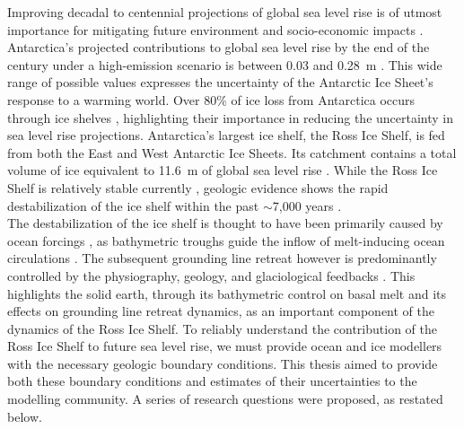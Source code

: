 

Improving decadal to centennial projections of global sea level rise is of utmost importance for mitigating future environment and socio-economic impacts \citep{durandsealevel2022}. 
Antarctica's projected contributions to global sea level rise by the end of the century under a high-emission scenario is between 0.03 and 0.28~m \citep[RCP 8.5,][]{intergovernmentalpanelonclimatechangeipccocean2022}. 
This wide range of possible values expresses the uncertainty of the Antarctic Ice Sheet's response to a warming world. 
Over 80\% of ice loss from Antarctica occurs through ice shelves \citep{rignoticeshelf2013}, highlighting their importance in reducing the uncertainty in sea level rise projections. 
Antarctica's largest ice shelf, the Ross Ice Shelf, is fed from both the East and West Antarctic Ice Sheets. 
Its catchment contains a total volume of ice equivalent to 11.6~m of global sea level rise \citep{fretwellbedmap22013, rignotantarctic2011, tintoross2019}. 
While the Ross Ice Shelf is relatively stable currently \citep{moholdtbasal2014, rignoticeshelf2013}, geologic evidence shows the rapid destabilization of the ice shelf within the past $\sim$7,000 years \citep[e.g.,][]{venturellimid2020, naishobliquitypaced2009}. \\

The destabilization of the ice shelf is thought to have been primarily caused by ocean forcings \citep{lowrydeglacial2019}, as bathymetric troughs guide the inflow of melt-inducing ocean circulations \citep{tintoross2019}. 
The subsequent grounding line retreat however is predominantly controlled by the physiography, geology, and glaciological feedbacks \citep{halberstadticesheet2016}. 
This highlights the solid earth, through its bathymetric control on basal melt and its effects on grounding line retreat dynamics, as an important component of the dynamics of the Ross Ice Shelf. 
To reliably understand the contribution of the Ross Ice Shelf to future sea level rise, we must provide ocean and ice modellers with the necessary geologic boundary conditions. 
This thesis aimed to provide both these boundary conditions and estimates of their uncertainties to the modelling community. 
A series of research questions were proposed, as restated below.

